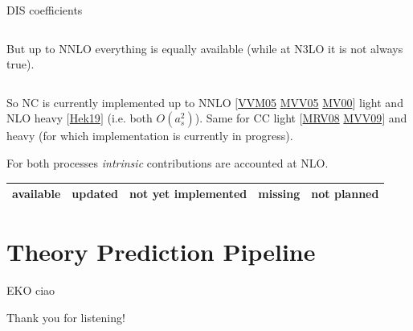 \documentclass[9pt]{beamer}
\providecommand{\iRef}[1]{{\color{mLightGreen}\small $[$#1$]$}}
\begin{document}
\begin{frame}{DIS coefficients}
\begin{columns}
\begin{column}{0.5\textwidth}
            \vspace*{10pt}
            {
                \footnotesize
                But up to NNLO everything is equally available (while at N3LO
                it is not always true).
            }
        \end{column}
    \end{columns}

    \vspace*{10pt}

    So NC is currently implemented up to NNLO
    \iRef{\href{https://doi.org/10.1016/j.nuclphysb.2005.06.020}{VVM05}
    \href{https://doi.org/10.1016/j.physletb.2004.11.063}{MVV05}
    \href{https://doi.org/10.1016/S0550-3213(00)00045-6}{MV00}}
    light and NLO heavy \iRef{\href{https://arxiv.org/abs/1910.01536}{Hek19}}
    (i.e. both $O(a_s^2)$).
    Same for CC light
    \iRef{\href{https://doi.org/10.1016/j.nuclphysb.2007.09.022}{MRV08}
    \href{https://doi.org/10.1016/j.nuclphysb.2009.01.001}{MVV09}} and heavy
    (for which implementation is currently in progress).

    For both processes \textit{intrinsic} contributions are accounted at NLO.
    
    \vspace*{15pt}
    {
        \footnotesize
        \begin{flushright}
            \begin{tabular}{c c c c c} 
                \cellcolor{green!25}available & \cellcolor{blue!25}updated
                                            &\cellcolor{yellow!25}not yet implemented
                                            &\cellcolor{red!25}missing
                                            & not planned\\
                \hline
            \end{tabular}
        \end{flushright}
    }
\end{frame}

\section{Theory Prediction Pipeline}

\begin{frame}{EKO}
    ciao
\end{frame}

\begin{frame}[standout]
    Thank you for listening!
\end{frame}
\end{document}
